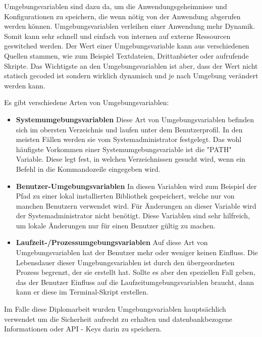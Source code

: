Umgebungsvariablen sind dazu da, um die Anwendungsgeheimnisse und Konfigurationen zu speichern, die wenn nötig von der Anwendung abgerufen werden können. Umgebungsvariablen verleihen einer Anwendung mehr Dynamik. Somit kann sehr schnell und einfach von internen auf externe Ressourcen geswitched werden. Der Wert einer Umgebungsvariable kann aus verschiedenen Quellen stammen, wie zum Beispiel Textdateien, Drittanbieter oder aufrufende Skripte. Das Wichtigste an den Umgebungsvariablen ist aber, dass der Wert nicht statisch gecoded ist sondern wirklich dynamisch und je nach Umgebung verändert werden kann.

Es gibt verschiedene Arten von Umgebungsvariablen:

\begin{itemize}
    \item \textbf{Systemumgebungsvariablen}
        \newline
        Diese Art von Umgebungsvariablen befinden sich im obersten Verzeichnis und laufen unter dem Benutzerprofil. In den meisten Fällen werden sie vom Systemadministrator festgelegt. Das wohl häufigste Vorkommen einer Systemumgebungsvariable ist die "PATH" Variable. Diese legt fest, in welchen Verzeichnissen gesucht wird, wenn ein Befehl in die Kommandozeile eingegeben wird.
        \cite{path_setzen}
        
    \item \textbf{Benutzer-Umgebungsvariablen}
        \newline
        In diesen Variablen wird zum Beispiel der Pfad zu einer lokal installierten Bibliothek gespeichert, welche nur von manchen Benutzern verwendet wird. Für Änderungen an dieser Variable wird der Systemadministrator nicht benötigt. Diese Variablen sind sehr hilfreich, um lokale Änderungen nur für einen Benutzer gültig zu machen.
    \item \textbf{Laufzeit-/Prozessumgebungsvariablen}
        \newline
        Auf diese Art von Umgebungsvariablen hat der Benutzer mehr oder weniger keinen Einfluss. Die Lebensdauer dieser Umgebungsvariablen ist durch den übergeordneten Prozess begrenzt, der sie erstellt hat.
        Sollte es aber den speziellen Fall geben, das der Benutzer Einfluss auf die Laufzeitumgebungsvariablen braucht, dann kann er diese im Terminal-Skript erstellen.
\end{itemize}

Im Falle diese Diplomarbeit wurden Umgebungsvariablen hauptsächlich verwendet um die Sicherheit aufrecht zu erhalten und datenbankbezogene Informationen oder API - Keys darin zu speichern.

